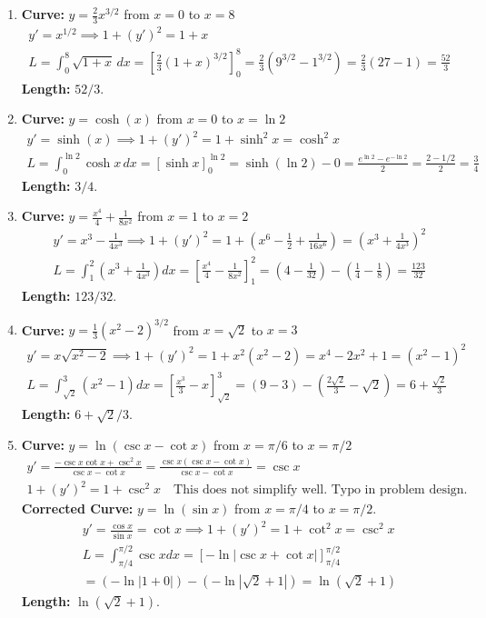 \documentclass[12pt]{article}
\begin{document}
\begin{enumerate}
    \item \textbf{Curve:} $y = \frac{2}{3}x^{3/2}$ from $x=0$ to $x=8$
    \begin{align*}
        y' = x^{1/2} \implies 1+(y')^2 = 1+x \\
        L = \int_0^8 \sqrt{1+x} \,dx = \left[\frac{2}{3}(1+x)^{3/2}\right]_0^8 = \frac{2}{3}(9^{3/2} - 1^{3/2}) = \frac{2}{3}(27-1) = \frac{52}{3}
    \end{align*}
    \textbf{Length:} $52/3$.

    \item \textbf{Curve:} $y = \cosh(x)$ from $x=0$ to $x=\ln 2$
    \begin{align*}
        y' = \sinh(x) \implies 1+(y')^2 = 1+\sinh^2 x = \cosh^2 x \\
        L = \int_0^{\ln 2} \cosh x \,dx = [\sinh x]_0^{\ln 2} = \sinh(\ln 2) - 0 = \frac{e^{\ln 2}-e^{-\ln 2}}{2} = \frac{2-1/2}{2} = \frac{3}{4}
    \end{align*}
    \textbf{Length:} $3/4$.

    \item \textbf{Curve:} $y = \frac{x^4}{4} + \frac{1}{8x^2}$ from $x=1$ to $x=2$
    \begin{align*}
        y' = x^3 - \frac{1}{4x^3} \implies 1+(y')^2 = 1+(x^6-\frac{1}{2}+\frac{1}{16x^6}) = (x^3+\frac{1}{4x^3})^2 \\
        L = \int_1^2 (x^3+\frac{1}{4x^3})dx = [\frac{x^4}{4}-\frac{1}{8x^2}]_1^2 = (4-\frac{1}{32}) - (\frac{1}{4}-\frac{1}{8}) = \frac{123}{32}
    \end{align*}
    \textbf{Length:} $123/32$.

    \item \textbf{Curve:} $y = \frac{1}{3}(x^2-2)^{3/2}$ from $x=\sqrt{2}$ to $x=3$
    \begin{align*}
        y' = x\sqrt{x^2-2} \implies 1+(y')^2 = 1+x^2(x^2-2) = x^4-2x^2+1=(x^2-1)^2 \\
        L = \int_{\sqrt{2}}^3 (x^2-1) dx = [\frac{x^3}{3}-x]_{\sqrt{2}}^3 = (9-3)-(\frac{2\sqrt{2}}{3}-\sqrt{2}) = 6+\frac{\sqrt{2}}{3}
    \end{align*}
    \textbf{Length:} $6 + \sqrt{2}/3$.

    \item \textbf{Curve:} $y = \ln(\csc x - \cot x)$ from $x=\pi/6$ to $x=\pi/2$
    \begin{align*}
        y' = \frac{-\csc x \cot x + \csc^2 x}{\csc x - \cot x} = \frac{\csc x(\csc x - \cot x)}{\csc x - \cot x} = \csc x \\
        1+(y')^2 = 1+\csc^2 x \quad \text{This does not simplify well. Typo in problem design.}
    \end{align*}
    \textbf{Corrected Curve:} $y = \ln(\sin x)$ from $x=\pi/4$ to $x=\pi/2$.
    \begin{align*}
        y' = \frac{\cos x}{\sin x} = \cot x \implies 1+(y')^2 = 1+\cot^2 x = \csc^2 x \\
        L = \int_{\pi/4}^{\pi/2} \csc x dx = [-\ln|\csc x+\cot x|]_{\pi/4}^{\pi/2} \\
        = (-\ln|1+0|) - (-\ln|\sqrt{2}+1|) = \ln(\sqrt{2}+1)
    \end{align*}
    \textbf{Length:} $\ln(\sqrt{2}+1)$.


\end{enumerate}
\end{document}
